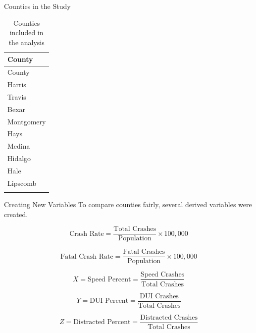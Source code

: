 \documentclass[
  ignorenonframetext,
  aspectratio=169]{beamer}
\begin{document}
\begin{frame}{Counties in the Study}
\label{counties-in-the-study}
\begin{longtable}[]{@{}l@{}}
\caption{Counties included in the analysis}\tabularnewline
\toprule\noalign{}
County \\
\midrule\noalign{}
\endfirsthead
\toprule\noalign{}
County \\
\midrule\noalign{}
\endhead
Harris \\
Travis \\
Bexar \\
Montgomery \\
Hays \\
Medina \\
Hidalgo \\
Hale \\
Lipscomb \\
\bottomrule\noalign{}
\end{longtable}
\end{frame}

\begin{frame}{Creating New Variables}
\label{creating-new-variables}
To compare counties fairly, several derived variables were created.

\[
\text{Crash Rate} = \frac{\text{Total Crashes}}{\text{Population}} \times 100{,}000
\]

\[
\text{Fatal Crash Rate} = \frac{\text{Fatal Crashes}}{\text{Population}} \times 100{,}000
\]

\[
X = \text{Speed Percent} = \frac{\text{Speed Crashes}}{\text{Total Crashes}}
\]

\[
Y = \text{DUI Percent} = \frac{\text{DUI Crashes}}{\text{Total Crashes}}
\]

\[
Z = \text{Distracted Percent} = \frac{\text{Distracted Crashes}}{\text{Total Crashes}}
\]
\end{frame}
\end{document}
